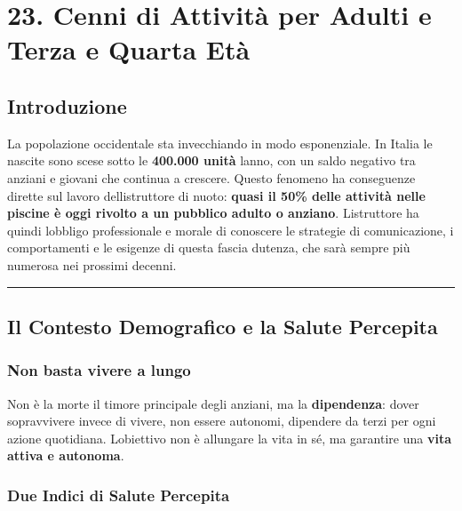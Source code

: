 \documentclass[a4paper,11pt]{article}
\begin{document}
\section{23. Cenni di Attività per Adulti e Terza e Quarta
  Età}\label{cenni-di-attivituxe0-per-adulti-e-terza-e-quarta-etuxe0}

\subsection{Introduzione}\label{introduzione-22}

La popolazione occidentale sta invecchiando in modo esponenziale. In
Italia le nascite sono scese sotto le \textbf{400.000 unità}
l\textquotesingle anno, con un saldo negativo tra anziani e giovani che
continua a crescere. Questo fenomeno ha conseguenze dirette sul lavoro
dell\textquotesingle istruttore di nuoto: \textbf{quasi il 50\% delle
      attività nelle piscine è oggi rivolto a un pubblico adulto o anziano}.
L\textquotesingle istruttore ha quindi l\textquotesingle obbligo
professionale e morale di conoscere le strategie di comunicazione, i
comportamenti e le esigenze di questa fascia d\textquotesingle utenza,
che sarà sempre più numerosa nei prossimi decenni.

\begin{center}\rule{0.5\linewidth}{0.5pt}\end{center}

\subsection{Il Contesto Demografico e la Salute
      Percepita}\label{il-contesto-demografico-e-la-salute-percepita}

\subsubsection{Non basta vivere a lungo}\label{non-basta-vivere-a-lungo}

Non è la morte il timore principale degli anziani, ma la
\textbf{dipendenza}: dover sopravvivere invece di vivere, non essere
autonomi, dipendere da terzi per ogni azione quotidiana.
L\textquotesingle obiettivo non è allungare la vita in sé, ma garantire
una \textbf{vita attiva e autonoma}.

\subsubsection{Due Indici di Salute
      Percepita}\label{due-indici-di-salute-percepita}
\end{document}
